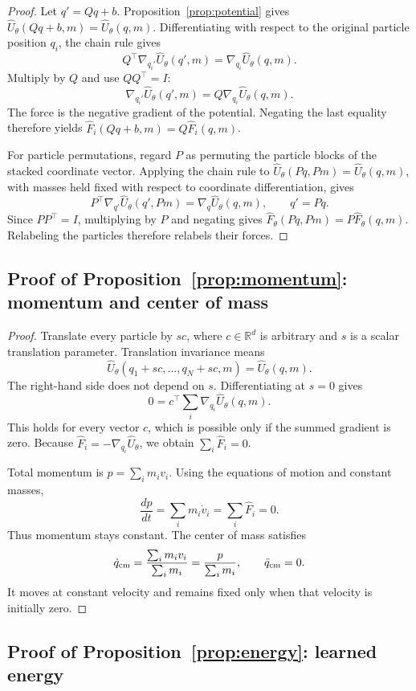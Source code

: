 \documentclass[10pt,letterpaper,twocolumn]{article}
\newcommand{\R}{\mathbb R}
\newcommand{\Fhat}{\widehat F}
\newcommand{\Uhat}{\widehat U}
\numberwithin{equation}{section}
\begin{document}
\begin{proof}
Let $q'=Qq+b$. Proposition~\ref{prop:potential} gives
$\Uhat_\theta(Qq+b,m)=\Uhat_\theta(q,m)$. Differentiating with respect to the original particle
position $q_i$, the chain rule gives
\[
Q^\top\nabla_{q_i'}\Uhat_\theta(q',m)=\nabla_{q_i}\Uhat_\theta(q,m).
\]
Multiply by $Q$ and use $QQ^\top=I$:
\[
\nabla_{q_i'}\Uhat_\theta(q',m)=Q\nabla_{q_i}\Uhat_\theta(q,m).
\]
The force is the negative gradient of the potential. Negating the last equality therefore yields
$\Fhat_i(Qq+b,m)=Q\Fhat_i(q,m)$.

For particle permutations, regard $P$ as permuting the particle blocks of the stacked coordinate
vector. Applying the chain rule to $\Uhat_\theta(Pq,Pm)=\Uhat_\theta(q,m)$, with masses held fixed
with respect to coordinate differentiation, gives
\[
P^\top\nabla_{q'}\Uhat_\theta(q',Pm)=\nabla_q\Uhat_\theta(q,m),\qquad q'=Pq.
\]
Since $PP^\top=I$, multiplying by $P$ and negating gives
$\Fhat_\theta(Pq,Pm)=P\Fhat_\theta(q,m)$. Relabeling the particles therefore relabels their forces.
\end{proof}

\subsection{Proof of Proposition~\ref{prop:momentum}: momentum and center of mass}
\label{proof:momentum}

\begin{proof}
Translate every particle by $sc$, where $c\in\R^d$ is arbitrary and $s$ is a scalar translation
parameter. Translation invariance means
\[
\Uhat_\theta(q_1+sc,\ldots,q_N+sc,m)=\Uhat_\theta(q,m).
\]
The right-hand side does not depend on $s$. Differentiating at $s=0$ gives
\[
0=c^\top\sum_i\nabla_{q_i}\Uhat_\theta(q,m).
\]
This holds for every vector $c$, which is possible only if the summed gradient is zero. Because
$\Fhat_i=-\nabla_{q_i}\Uhat_\theta$, we obtain $\sum_i\Fhat_i=0$.

Total momentum is $p=\sum_i m_iv_i$. Using the equations of motion and constant masses,
\[
\frac{dp}{dt}=\sum_i m_i\dot v_i=\sum_i\Fhat_i=0.
\]
Thus momentum stays constant. The center of mass satisfies
\[
\dot q_{\rm cm}=\frac{\sum_i m_iv_i}{\sum_i m_i}
=\frac{p}{\sum_i m_i},\qquad \ddot q_{\rm cm}=0.
\]
It moves at constant velocity and remains fixed only when that velocity is initially zero.
\end{proof}

\subsection{Proof of Proposition~\ref{prop:energy}: learned energy}
\label{proof:energy}
\end{document}

